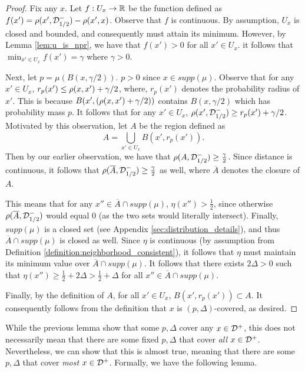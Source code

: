 \begin{proof}
Fix any $x$. Let $f: U_x \to \mathbb R$ be the function defined as $f(x') = \rho(x', {\mathcal D}_{1/2}^{-}) - \rho(x', x)$. Observe that $f$ is continuous. By assumption, $U_x$ is closed and bounded, and consequently must attain its minimum. However, by Lemma \ref{lem:u_is_npr}, we have that $f(x') > 0$ for all $x' \in U_x$. it follows that $\min_{x' \in U_x} f(x') = \gamma$ where $\gamma > 0$.

Next, let $p = \mu(B(x, \gamma/2))$. $p > 0$ since $x \in supp(\mu)$. Observe that for any $x' \in U_x$, $r_p(x') \leq \rho(x, x') + \gamma/2$, where, $r_p(x')$ denotes the probability radius of $x'$. This is because $B(x', (\rho(x, x') + \gamma/2))$ contains $B(x, \gamma/2)$ which has probability mass $p$. It follows that for any $x' \in U_x$, $\rho(x', {\mathcal D}_{1/2}^{-}) \geq r_p(x') + \gamma/2$. Motivated by this observation, let $A$ be the region defined as $$A = \bigcup_{x' \in U_x} B(x', r_p(x')).$$ Then by our earlier observation, we have that $\rho(A, {\mathcal D}_{1/2}^{-}) \geq \frac{\gamma}{2}$. Since distance is continuous, it follows that $\rho(\overline{A}, {\mathcal D}_{1/2}^{-}) \geq \frac{\gamma}{2}$ as well, where $\overline{A}$ denotes the closure of $A$. 

This means that for any $x'' \in \overline{A} \cap supp(\mu)$, $\eta(x'') > \frac{1}{2}$, since otherwise $\rho(\overline{A}, {\mathcal D}_{1/2}^{-})$ would equal $0$ (as the two sets would literally intersect). Finally, $supp(\mu)$ is a closed set (see Appendix \ref{sec:distribution_details}), and thus $\overline{A} \cap supp(\mu)$ is closed as well. Since $\eta$ is continuous (by assumption from Definition \ref{definition:neighborhood_consistent}), it follows that $\eta$ must maintain its minimum value over $\overline{A} \cap supp(\mu)$. It follows that there exists $2\Delta > 0$ such that $\eta(x'') \geq \frac{1}{2} + 2\Delta > \frac{1}{2} + \Delta$ for all $x'' \in \overline{A} \cap supp(\mu)$. 

Finally, by the definition of $A$, for all $x' \in U_x$, $B(x', r_p(x')) \subset A$. It consequently follows from the definition that $x$ is $(p, \Delta)$-covered, as desired. 
\end{proof}

While the previous lemma show that some $p, \Delta$ cover any $x \in {\mathcal D}^+$, this does not necessarily mean that there are some fixed $p, \Delta$ that cover \textit{all} $x \in {\mathcal D}^+$. Nevertheless, we can show that this is almost true, meaning that there are some $p, \Delta$ that cover \textit{most} $x \in {\mathcal D}^+$. Formally, we have the following lemma.


